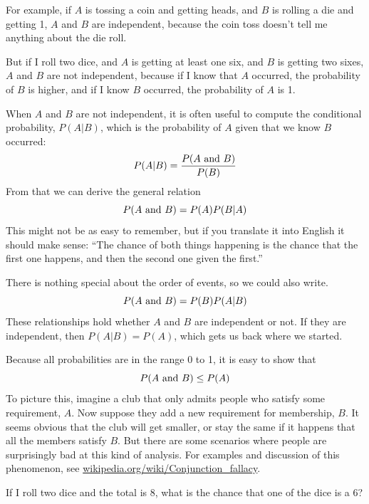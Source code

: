 \documentclass[12pt]{book}
\begin{document}

For example, if $A$ is tossing a coin and getting heads, and $B$
is rolling a die and getting 1, $A$ and $B$ are independent, because
the coin toss doesn't tell me anything about the die roll.


But if I roll two dice, and $A$ is getting at least one six, and
$B$ is getting two sixes, $A$ and $B$ are not independent, because
if I know that $A$ occurred, the probability of $B$ is higher, and
if I know $B$ occurred, the probability of $A$ is 1.


When $A$ and $B$ are not independent, it is often useful to compute
the conditional probability, $P(A|B)$, which is the probability of
$A$ given that we know $B$ occurred:
%
\[ P(A|B) = \frac{P(A ~\mbox{and}~ B)}{P(B)} \]
%
From that we can derive the general relation
%
\[ P(A ~\mbox{and}~ B) = P(A) P(B|A) \]
%
This might not be as easy to remember, but if you translate it into
English it should make sense: ``The chance of both things happening
is the chance that the first one happens, and then the second one
given the first.''

There is nothing special about the order of events, so we could also
write.
%
\[ P(A ~\mbox{and}~ B) = P(B) P(A|B) \]
%
These relationships hold whether $A$ and $B$ are independent or not.
If they are independent, then $P(A|B) = P(A)$, which gets us back
where we started.

Because all probabilities are in the range 0 to 1, it is
easy to show that 
%
\[ P(A ~\mbox{and}~ B) \le P(A) \]
%
To picture this, imagine a club that only admits people who satisfy
some requirement, $A$.  Now suppose they add a new requirement for
membership, $B$.  It seems obvious that the club will get smaller, or
stay the same if it happens that all the members satisfy $B$.  But
there are some scenarios where people are surprisingly bad at this
kind of analysis.  For examples and discussion of this phenomenon, see
\url{wikipedia.org/wiki/Conjunction_fallacy}.


\begin{exercise}
If I roll two dice and the total is 8, what is the chance that
one of the dice is a 6?


\end{exercise}
\end{document}
